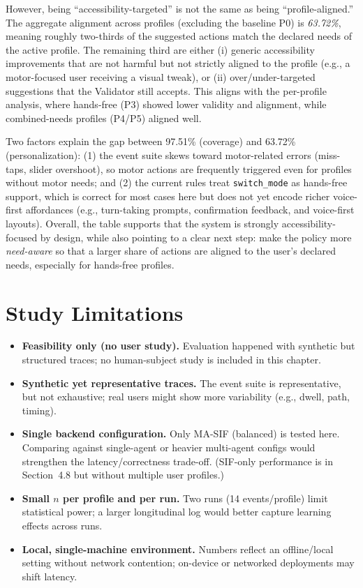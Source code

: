 \documentclass[openany]{book}
\begin{document}
However, being “accessibility-targeted” is not the same as being “profile-aligned.” The aggregate alignment across profiles (excluding the baseline P0) is \emph{63.72\%}, meaning roughly two-thirds of the suggested actions match the declared needs of the active profile. The remaining third are either (i) generic accessibility improvements that are not harmful but not strictly aligned to the profile (e.g., a motor-focused user receiving a visual tweak), or (ii) over/under-targeted suggestions that the Validator still accepts. This aligns with the per-profile analysis, where hands-free (P3) showed lower validity and alignment, while combined-needs profiles (P4/P5) aligned well.

Two factors explain the gap between 97.51\% (coverage) and 63.72\% (personalization): (1) the event suite skews toward motor-related errors (miss-taps, slider overshoot), so motor actions are frequently triggered even for profiles without motor needs; and (2) the current rules treat \texttt{switch\_mode} as hands-free support, which is correct for most cases here but does not yet encode richer voice-first affordances (e.g., turn-taking prompts, confirmation feedback, and voice-first layouts). Overall, the table supports that the system is strongly accessibility-focused by design, while also pointing to a clear next step: make the policy more \emph{need-aware} so that a larger share of actions are aligned to the user’s declared needs, especially for hands-free profiles.

\section{Study Limitations}
\begin{itemize}
    \item \textbf{Feasibility only (no user study).} Evaluation happened with synthetic but structured traces; no human-subject study is included in this chapter.
    \item \textbf{Synthetic yet representative traces.} The event suite is representative, but not exhaustive; real users might show more variability (e.g., dwell, path, timing).
    \item \textbf{Single backend configuration.} Only MA-SIF (balanced) is tested here. Comparing against single-agent or heavier multi-agent configs would strengthen the latency/correctness trade-off. (SIF-only performance is in Section~4.8 but without multiple user profiles.)
    \item \textbf{Small $n$ per profile and per run.} Two runs (14 events/profile) limit statistical power; a larger longitudinal log would better capture learning effects across runs.
    \item \textbf{Local, single-machine environment.} Numbers reflect an offline/local setting without network contention; on-device or networked deployments may shift latency.
\end{itemize}
\end{document}
